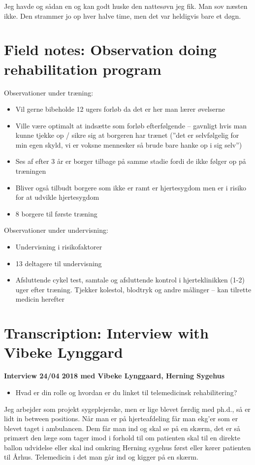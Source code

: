 Jeg havde og sådan en og kan godt huske den nattesøvn jeg fik. Man sov næsten ikke. Den strammer jo op hver halve time, men det var heldigvis bare et døgn. 


\chapter{Field notes: Observation doing rehabilitation program} \label{field}

Observationer under træning: 
\begin{itemize}
	\item Vil gerne bibeholde 12 ugers forløb da det er her man lærer øvelserne
	\item Ville være optimalt at indsætte som forløb efterfølgende – gavnligt hvis man kunne tjekke op / sikre sig at borgeren har trænet (”det er selvfølgelig for min egen skyld, vi er voksne mennesker så brude bare hanke op i sig selv”) 
	\item Ses af efter 3 år er borger tilbage på samme stadie fordi de ikke følger op på træningen 
	\item Bliver også tilbudt borgere som ikke er ramt er hjertesygdom men er i risiko for at udvikle hjertesygdom 
	\item 8 borgere til første træning
\end{itemize}

Observationer under undervisning:
\begin{itemize}
	\item Undervisning i risikofaktorer 
	\item 13 deltagere til undervisning
	\item Afsluttende cykel test, samtale og afsluttende kontrol i hjerteklinikken (1-2) uger efter træning. Tjekker kolestol, blodtryk og andre målinger – kan tilrette medicin herefter 
\end{itemize}




\chapter{Transcription: Interview with Vibeke Lynggard} \label{vibeke}



\textbf{Interview 24/04 2018 med Vibeke Lynggaard, Herning Sygehus}

\begin{itemize}
	\item Hvad er din rolle og hvordan er du linket til telemedicinsk rehabilitering? 
\end{itemize} 
Jeg arbejder som projekt sygeplejerske, men er lige blevet færdig med ph.d., så er lidt in between positions. Når man er på hjerteafdeling får man ekg’er som er blevet taget i ambulancen. Dem får man ind og skal se på en skærm, det er så primært den læge som tager imod i forhold til om patienten skal til en direkte ballon udvidelse eller skal ind omkring Herning sygehus først eller kører patienten til Århus. Telemedicin i det man går ind og kigger på en skærm. 

